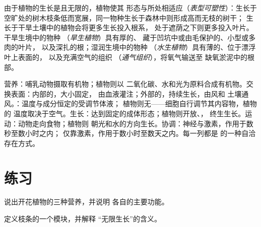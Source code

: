 \begin{proposition}[形态随环境而定]\label{prop:b1:flowering-plant-organization:plasticity}
由于植物的生长是且无限的，植物使其
形态与所处相适应（\emph{表型可塑性}）：生长于空旷处的树木枝条低而宽展，同一物种生长于森林中则形成高而无枝的树干；
生长于干旱土壤中的植物会将更多生长投入根系，
处于遮荫之下则更多投入叶片。干旱生境中的物种
（\emph{旱生植物}）具有厚的、
藏于凹坑中或由毛保护的、小型或多肉的叶片，
以及深扎的根；湿润生境中的物种
（\emph{水生植物}）具有薄的、位于漂浮叶上表面的，
以及充满空气的组织
（\emph{通气组织}），将氧气输送至
缺氧淤泥中的根部。
\end{proposition}

\begin{example}\label{ex:b1:flowering-plant-organization:comparison}
营养：哺乳动物摄取有机物；植物则以
二氧化碳、水和光为原料合成有机物。交换表面：内部的，大小固定，
由血液灌注；外部的，持续生长，由风和
土壤通风。：温度与成分恒定的受调节体液；
植物则无——细胞自行调节其内容物，植物的
温度取决于空气。生长：达到固定的成体形态；植物则开放、，
终生生长。运动：动物走向食物；植物则
朝光和水的方向生长。协调：神经与激素，作用于数秒至数小时之内；
仅靠激素，作用于数小时至数天之内。每一列都是
的一种自洽存在方式。
\end{example}

\section{练习}

\begin{exercise}[$\star$]\label{exo:b1:flowering-plant-organization:1}
说出开花植物的三种营养，并说明
各自的主要功能。
\end{exercise}

\begin{exercise}[$\star$]\label{exo:b1:flowering-plant-organization:2}
定义枝条的一个模块，并解释
“无限生长”的含义。
\end{exercise}

